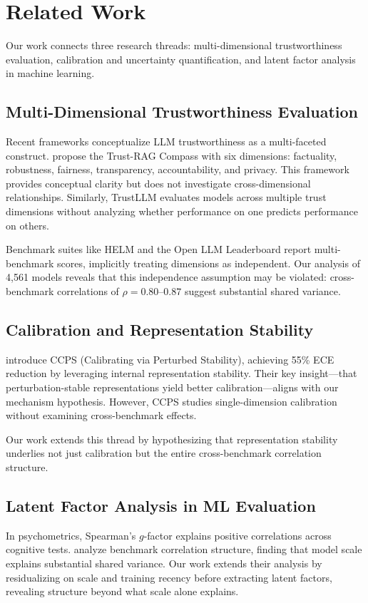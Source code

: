 \section{Related Work}

Our work connects three research threads: multi-dimensional trustworthiness evaluation, calibration and uncertainty quantification, and latent factor analysis in machine learning.

\subsection{Multi-Dimensional Trustworthiness Evaluation}

Recent frameworks conceptualize LLM trustworthiness as a multi-faceted construct. \citet{zhou2024trustrag} propose the Trust-RAG Compass with six dimensions: factuality, robustness, fairness, transparency, accountability, and privacy. This framework provides conceptual clarity but does not investigate cross-dimensional relationships. Similarly, TrustLLM \citep{sun2024trustllm} evaluates models across multiple trust dimensions without analyzing whether performance on one predicts performance on others.

Benchmark suites like HELM \citep{liang2023helm} and the Open LLM Leaderboard \citep{beeching2023openllm} report multi-benchmark scores, implicitly treating dimensions as independent. Our analysis of 4,561 models reveals that this independence assumption may be violated: cross-benchmark correlations of $\rho = 0.80$--$0.87$ suggest substantial shared variance.

\subsection{Calibration and Representation Stability}

\citet{khanmohammadi2025ccps} introduce CCPS (Calibrating via Perturbed Stability), achieving 55\% ECE reduction by leveraging internal representation stability. Their key insight---that perturbation-stable representations yield better calibration---aligns with our mechanism hypothesis. However, CCPS studies single-dimension calibration without examining cross-benchmark effects.

Our work extends this thread by hypothesizing that representation stability underlies not just calibration but the entire cross-benchmark correlation structure.

\subsection{Latent Factor Analysis in ML Evaluation}

In psychometrics, Spearman's $g$-factor explains positive correlations across cognitive tests. \citet{schumacher2024factor} analyze benchmark correlation structure, finding that model scale explains substantial shared variance. Our work extends their analysis by residualizing on scale and training recency before extracting latent factors, revealing structure beyond what scale alone explains.

